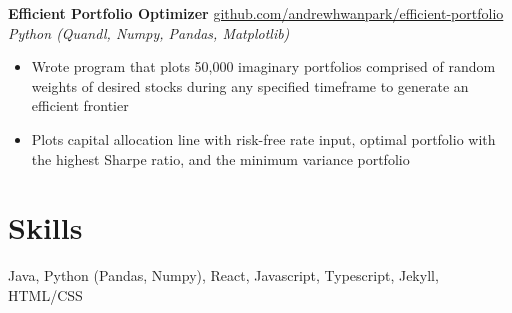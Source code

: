 \documentclass[margin]{res}
\begin{document}
\begin{resume}
	{\bf Efficient Portfolio Optimizer} \hfill \href{https://github.com/andrewhwanpark/efficient-portfolio}{github.com/andrewhwanpark/efficient-portfolio}\\
	{\it Python (Quandl, Numpy, Pandas, Matplotlib)}
	\begin{itemize} \itemsep -2pt
		\item Wrote program that plots 50,000 imaginary portfolios comprised of random weights of desired stocks during any specified timeframe to generate an efficient frontier
		\item Plots capital allocation line with risk-free rate input, optimal portfolio with the highest Sharpe ratio, and the minimum variance portfolio
	\end{itemize}
	
	
	\section{Skills} 
	Java, Python (Pandas, Numpy), React, Javascript, Typescript, Jekyll, HTML/CSS
	
	
\end{resume} 
\end{document}
